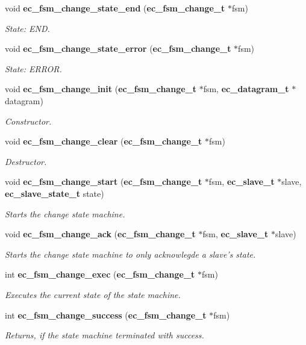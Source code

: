 \begin{DoxyCompactItemize}
void {\bf ec\-\_\-fsm\-\_\-change\-\_\-state\-\_\-end} ({\bf ec\-\_\-fsm\-\_\-change\-\_\-t} $\ast$fsm)
\begin{DoxyCompactList}\small\item\em State\-: E\-N\-D. \end{DoxyCompactList}\item 
void {\bf ec\-\_\-fsm\-\_\-change\-\_\-state\-\_\-error} ({\bf ec\-\_\-fsm\-\_\-change\-\_\-t} $\ast$fsm)
\begin{DoxyCompactList}\small\item\em State\-: E\-R\-R\-O\-R. \end{DoxyCompactList}\item 
void {\bf ec\-\_\-fsm\-\_\-change\-\_\-init} ({\bf ec\-\_\-fsm\-\_\-change\-\_\-t} $\ast$fsm, {\bf ec\-\_\-datagram\-\_\-t} $\ast$datagram)
\begin{DoxyCompactList}\small\item\em Constructor. \end{DoxyCompactList}\item 
void {\bf ec\-\_\-fsm\-\_\-change\-\_\-clear} ({\bf ec\-\_\-fsm\-\_\-change\-\_\-t} $\ast$fsm)
\begin{DoxyCompactList}\small\item\em Destructor. \end{DoxyCompactList}\item 
void {\bf ec\-\_\-fsm\-\_\-change\-\_\-start} ({\bf ec\-\_\-fsm\-\_\-change\-\_\-t} $\ast$fsm, {\bf ec\-\_\-slave\-\_\-t} $\ast$slave, {\bf ec\-\_\-slave\-\_\-state\-\_\-t} state)
\begin{DoxyCompactList}\small\item\em Starts the change state machine. \end{DoxyCompactList}\item 
void {\bf ec\-\_\-fsm\-\_\-change\-\_\-ack} ({\bf ec\-\_\-fsm\-\_\-change\-\_\-t} $\ast$fsm, {\bf ec\-\_\-slave\-\_\-t} $\ast$slave)
\begin{DoxyCompactList}\small\item\em Starts the change state machine to only acknowlegde a slave's state. \end{DoxyCompactList}\item 
int {\bf ec\-\_\-fsm\-\_\-change\-\_\-exec} ({\bf ec\-\_\-fsm\-\_\-change\-\_\-t} $\ast$fsm)
\begin{DoxyCompactList}\small\item\em Executes the current state of the state machine. \end{DoxyCompactList}\item 
int {\bf ec\-\_\-fsm\-\_\-change\-\_\-success} ({\bf ec\-\_\-fsm\-\_\-change\-\_\-t} $\ast$fsm)
\begin{DoxyCompactList}\small\item\em Returns, if the state machine terminated with success. \end{DoxyCompactList}\end{DoxyCompactItemize}
